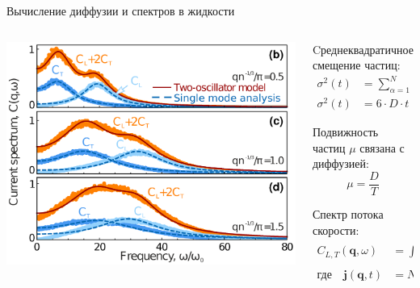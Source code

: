 \documentclass{beamer} %
\begin{document}
\begin{frame}{Вычисление диффузии и спектров в жидкости}
  \footnotesize{
    \begin{columns}
      \begin{column}{0.5\linewidth}
        \begin{center}
          \includegraphics[width=\textwidth]{CFS-Figure1.png}
        \end{center}

      \end{column}

      \begin{column}{0.5\linewidth}

        Cреднеквадратичное смещение частиц:
        \begin{align}
          \sigma^2(t) &= \sum\limits_{\alpha = 1}^{N} (r_{\alpha}(t) - r_{\alpha}(0))^2 / N \\
          \sigma^2(t) &= 6\cdot D\cdot t
                        \label{eqRMS}
        \end{align}

        Подвижность частиц $\mu$ связана с диффузией:
        \begin{equation}
          \mu = \frac{D}{T}
          \label{eqMobility}
        \end{equation}

        Спектр потока скорости:
        \begin{align}
          C_{L, T}(\mathbf{q}, \omega)&=\int dt e^{i \omega t} \text{Re} \left\langle\mathbf{j}_{L, T}(\mathbf{q}, t) \mathbf{j}_{L, T}(-\mathbf{q}, 0)\right\rangle \\
          \text{где} \quad \mathbf{j}(\mathbf{q}, t)&=N^{-1} \sum_{s} \mathbf{v}_{s}(t) \exp \left(i \mathbf{q} \mathbf{r}_{s}(t)\right)
        \end{align}


\end{column}
\end{columns}}
\end{frame}
\end{document}
